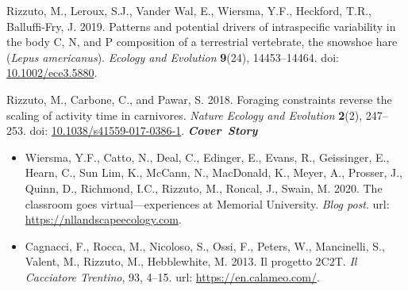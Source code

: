 \begin{etaremune}[topsep=0pt,itemsep=1pt,partopsep=0pt,parsep=0pt]
  \item \textcolor{awesome}{Rizzuto, M.}, Leroux, S.J., Vander Wal, E., Wiersma, Y.F., Heckford, T.R., Balluffi-Fry, J. 2019. Patterns and potential drivers of intraspecific variability in the body C, N, and P composition of a terrestrial vertebrate, the snowshoe hare (\textit{Lepus americanus}). \textit{Ecology and Evolution} \textbf{9}(24), 14453--14464. doi: \href{https://doi.org/10.1002/ece3.5880}{10.1002/ece3.5880}.
  \item \textcolor{awesome}{Rizzuto, M.}, Carbone, C., and Pawar, S. 2018. Foraging constraints reverse the scaling of activity time in carnivores. \emph{Nature Ecology and Evolution} \textbf{2}(2), 247--253. doi: \href{https://doi.org/10.1038/s41559-017-0386-1}{10.1038/s41559-017-0386-1}. \null\hfill\textbf{\textit{Cover~Story}}
\end{etaremune}

  

\begin{itemize}[noitemsep] 
  \item Wiersma, Y.F., Catto, N., Deal, C., Edinger, E., Evans, R., Geissinger, E., Hearn, C., Sun Lim, K., McCann, N., MacDonald, K., Meyer, A., Prosser, J., Quinn, D., Richmond, I.C., \textcolor{awesome}{Rizzuto, M.}, Roncal, J., Swain, M. 2020. The classroom goes virtual---experiences at Memorial University. \emph{Blog post}. url: \href{https://nllandscapeecology.com/blog-post-teaching-and-learning-remotely-time-to-read-4-min-45-s/}{https://nllandscapeecology.com}.
  \item Cagnacci, F., Rocca, M., Nicoloso, S., Ossi, F., Peters, W., Mancinelli, S., Valent, M., \textcolor{awesome}{Rizzuto, M.}, Hebblewhite, M. 2013. Il progetto 2C2T. \emph{Il Cacciatore Trentino}, 93, 4--15. url: \href{https://en.calameo.com/read/00214567355b1384f96d0}{https://en.calameo.com/}.
\end{itemize}


  


  
